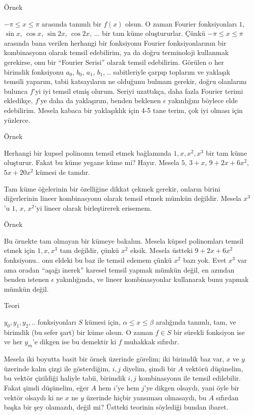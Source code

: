 \documentclass[12pt,fleqn]{article}\usepackage{../../common}
\begin{document}
Örnek

$-\pi \le x \le \pi$ arasında tanımlı bir $f(x)$ olsun. O zaman Fourier
fonksiyonları $1$, $\sin x$, $\cos x$, $\sin 2x$, $\cos 2x$, ... bir tam küme
oluştururlar. Çünkü $-\pi \le x \le \pi$ arasında bana verilen herhangi bir
fonksiyonu Fourier fonksiyonlarının bir kombinasyonu olarak temsil edebilirim,
ya da doğru terminoloji kullanmak gerekirse, onu bir ``Fourier Serisi'' olarak
temsil edebilirim. Görülen o her birimdik fonksiyonu $a_0$, $b_0$, $a_1$, $b_1$,
.. sabitleriyle çarpıp toplarım ve yaklaşık temsili yaparım, tabii katsayıların
ne olduğunu bulmam gerekir, doğru olanlarını bulunca $f$'yi iyi temsil etmiş
olurum. Seriyi uzattıkça, daha fazla Fourier terimi ekledikçe, $f$'ye daha da
yaklaşırım, benden beklenen $\epsilon$ yakınlığını böylece elde edebilirim. 
Mesela kabaca bir yaklaşıklık için 4-5 tane terim, çok iyi olması için
yüzlerce. 

Örnek

Herhangi bir kupsel polinomu temsil etmek bağlamında $1,x,x^2,x^3$ bir
tam küme oluşturur. Fakat bu küme yegane küme mi? Hayır. Mesela
$5$, $3+x$, $9 + 2x + 6x^2$, $5x + 20x^2$ kümesi de tamdır.

Tam küme öğelerinin bir özelliğine dikkat çekmek gerekir, onların birini
diğerlerinin lineer kombinasyonu olarak temsil etmek mümkün değildir.
Mesela $x^3$'u $1$, $x$, $x^2$'yi lineer olarak birleştirerek erisemem. 

Örnek

Bu örnekte tam olmayan bir kümeye bakalım. Mesela küpsel polinomları temsil
etmek için $1,x,x^3$ tam değildir, çünkü $x^2$ eksik. Mesela üstteki
$9 + 2x + 6x^2$ fonksiyonu.. onu eldeki bu baz ile temsil edemem çünkü
$x^2$ bazı yok. Evet $x^3$ var ama oradan ``aşağı inerek'' karesel temsil
yapmak mümkün değil, en azından benden istenen $\epsilon$ yakınlığında,
ve lineer kombinasyonlar kullanarak bunu yapmak mümkün değil.

Teori

$y_0,y_1,y_2,..$ fonksiyonları $S$ kümesi için, $\alpha \le x \le \beta$
aralığında tanımlı, tam, ve birimdik (bu sefer şart) bir küme olsun. O zaman
$f \in S$ bir sürekli fonksiyon ise ve her $y_m$'e dikgen ise bu demektir ki
$f$ muhakkak sıfırdır.

Mesela iki boyutta basit bir örnek üzerinde görelim; iki birimdik baz var, $x$
ve $y$ üzerinde kalın çizgi ile gösterdiğim, $i,j$ diyelim, şimdi bir $A$
vektörü düşünelim, bu vektör çizildiği haliyle tabii, birimdik $i,j$
kombinasyonu ile temsil edilebilir. Fakat şimdi düşünelim, eğer $A$
hem $i$'ye hem $j$'ye dikgen olsaydı, yani öyle bir vektör olsaydı ki
ne $x$ ne $y$ üzerinde hiçbir yansıması olmasaydı, bu $A$ sıfırdan başka
bir şey olamazdı, değil mi? Üstteki teorinin söylediği bundan ibaret. 
\end{document}
